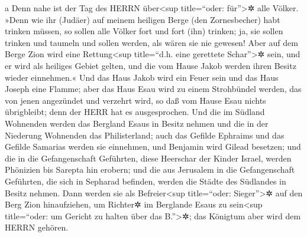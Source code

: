 a Denn nahe ist der Tag des HERRN über\textless sup title=``oder:
für''\textgreater✲ alle Völker. »Denn wie ihr (Judäer)
auf meinem heiligen Berge (den Zornesbecher) habt trinken müssen, so
sollen alle Völker fort und fort (ihn) trinken; ja, sie sollen trinken
und taumeln und sollen werden, als wären sie nie gewesen!
Aber auf dem Berge Zion wird eine Rettung\textless sup
title=``d.h. eine gerettete Schar''\textgreater✲ sein, und er wird als
heiliges Gebiet gelten, und die vom Hause Jakob werden ihren Besitz
wieder einnehmen.« Und das Haus Jakob wird ein Feuer sein
und das Haus Joseph eine Flamme; aber das Haus Esau wird zu einem
Strohbündel werden, das von jenen angezündet und verzehrt wird, so daß
vom Hause Esau nichts übrigbleibt; denn der HERR hat es ausgesprochen.
Und die im Südland Wohnenden werden das Bergland Esaus in
Besitz nehmen und die in der Niederung Wohnenden das Philisterland; auch
das Gefilde Ephraims und das Gefilde Samarias werden sie einnehmen, und
Benjamin wird Gilead besetzen; und die in die
Gefangenschaft Geführten, diese Heerschar der Kinder Israel, werden
Phönizien bis Sarepta hin erobern; und die aus Jerusalem in die
Gefangenschaft Geführten, die sich in Sepharad befinden, werden die
Städte des Südlandes in Besitz nehmen. Dann werden sie
als Befreier\textless sup title=``oder: Sieger''\textgreater✲ auf den
Berg Zion hinaufziehen, um Richter✲ im Berglande Esaus zu
sein\textless sup title=``oder: um Gericht zu halten über das
B.''\textgreater✲; das Königtum aber wird dem HERRN gehören.

